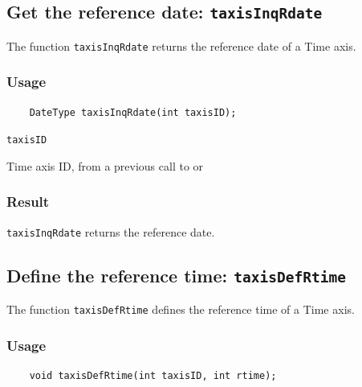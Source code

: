 \subsection{Get the reference date: \texttt{taxisInqRdate}}
\label{taxisInqRdate}

The function {\texttt{taxisInqRdate}} returns the reference date of a Time axis.

\subsubsection*{Usage}

\begin{verbatim}
    DateType taxisInqRdate(int taxisID);
\end{verbatim}

\hspace*{4mm}\begin{minipage}[]{15cm}
\begin{deflist}{\texttt{taxisID}\ }
\item[\texttt{taxisID}]
Time axis ID, from a previous call to {} or {}

\end{deflist}
\end{minipage}

\subsubsection*{Result}

{\texttt{taxisInqRdate}} returns the reference date.



\subsection{Define the reference time: \texttt{taxisDefRtime}}
\label{taxisDefRtime}

The function {\texttt{taxisDefRtime}} defines the reference time of a Time axis.

\subsubsection*{Usage}

\begin{verbatim}
    void taxisDefRtime(int taxisID, int rtime);
\end{verbatim}

